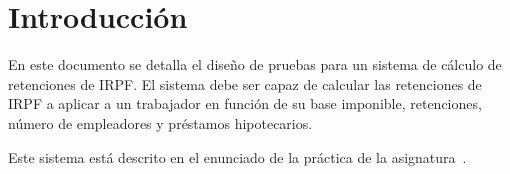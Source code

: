 \chapter{Introducción}
En este documento se detalla el diseño de pruebas para un sistema de cálculo de retenciones de IRPF. El sistema
debe ser capaz de calcular las retenciones de IRPF a aplicar a un trabajador en función de su base imponible,
retenciones, número de empleadores y préstamos hipotecarios.

Este sistema está descrito en el enunciado de la práctica de la asignatura~\cite{enunciado}.
